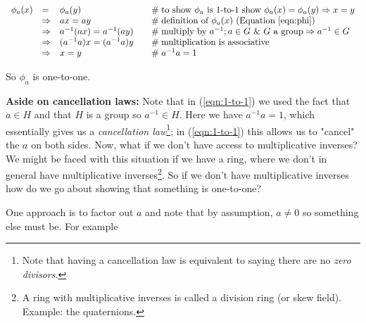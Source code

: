 \documentclass[11pt, oneside]{article}   	%
\theoremstyle{definition}
\begin{document}
\begin{equation}
\begin{array}{llll}
\phi_{a}(x)  
&=&                 \phi_{a}(y)                        &\quad  \mathrel{\#} \text{to show $\phi_a$ is 1-to-1 show } \phi_a(x) = \phi_a(y) \Rightarrow x = y      \\                                                                                                                     
&\Rightarrow& ax = ay                            &\quad  \mathrel{\#} \text{definition of $\phi_a(x)$ (Equation \ref{eqn:phi})}                                                                                     \\
&\Rightarrow& a^{-1}(ax) = a^{-1}(ay)     &\quad  \mathrel{\#} \text{multiply by $a^{-1}$};  a \in G \text{ \& $G$ a group} \Rightarrow a^{-1} \in G \\
&\Rightarrow&  (a^{-1}a)x = (a^{-1}a)y    &\quad  \mathrel{\#} \text{multiplication is associative}                                                                             \\
&\Rightarrow&  x = y                                &\quad  \mathrel{\#} a^{-1}a = 1 
\end{array}
\label{eqn:1-to-1}
\end{equation}

\bigskip
\noindent
So $\phi_{a}$ is one-to-one.

\bigskip
\noindent
\textbf{Aside on cancellation laws:} Note that in (\ref{eqn:1-to-1}) we used the fact that $a \in H$ and that $H$ is a group so $a^{-1} \in H$.
Here we have  $a^{-1}a = 1$, which essentially gives us a \emph{cancellation law}\footnote{Note that having a cancellation law is equivalent to saying 
there are no \emph{zero divisors}.}; in  (\ref{eqn:1-to-1}) this allows us to "cancel" the $a$ on both sides. Now, what if we don't have 
access to multiplicative inverses? We might be faced with this situation if we have a ring, where we don't in general have multiplicative 
inverses\footnote{A ring with multiplicative inverses is called a division ring (or skew field).  Example: the quaternions.}. So if we don't  have multiplicative 
inverses how do we go about showing that something is one-to-one? 

\bigskip
\noindent
One  approach is to factor out $a$ and note that by assumption, $a \neq 0$
so something else must be. For example
\end{document}
